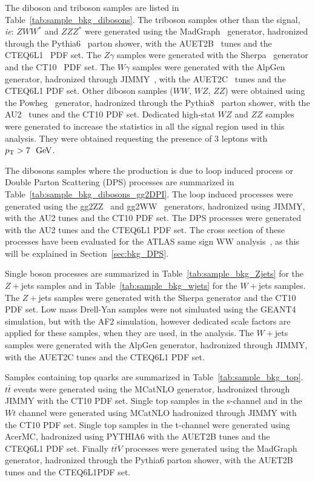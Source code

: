 The diboson and triboson samples are listed in Table~\ref{tab:sample_bkg_dibosons}. The triboson samples other than the signal, \textit{ie}: $ZWW^{*}$ and $ZZZ^{*}$ were generated using the MadGraph~\cite{Alwall_madgraph} generator, hadronized through the Pythia6~\cite{PYTHIA} parton shower, with the AUET2B~\cite{ATL-PHYS-PUB-2011-009} tunes and the CTEQ6L1~\cite{Pumplin:2002vw} PDF set. The $Z\gamma$ samples were generated with the Sherpa~\cite{sherpa} generator and the CT10~\cite{Guzzi:2011sv} PDF set. The $W\gamma$ samples were generated with the AlpGen~\cite{ALPGEN} generator, hadronized through JIMMY~\cite{Jimmy}, with the AUET2C~\cite{ATL-PHYS-PUB-2011-009} tunes and the CTEQ6L1 PDF set. Other diboson samples ($WW$, $WZ$, $ZZ$) were obtained using the Powheg~\cite{Alioli:2008gx,Nason:2004rx,Frixione:2007vw,Alioli:2010xd} generator, hadronized through the Pythia8~\cite{Sjostrand:2007gs} parton shower, with the AU2~\cite{atlasmctunes} tunes and the CT10 PDF set. Dedicated high-stat $WZ$ and $ZZ$ samples were generated to increase the statistics in all the signal region used in this analysis. They were obtained requesting the presence of 3 leptons with $\pt>7~\GeV$.

The dibosons samples where the production is due to loop induced process or Double Parton Scattering (DPS) processes are summarized in Table~\ref{tab:sample_bkg_dibosons_gg2DPI}. The loop induced processes were generated using the gg2ZZ~\cite{Binoth:2008pr} and gg2WW~\cite{Binoth:2006mf} generators, hadronized using JIMMY, with the AU2 tunes and the CT10 PDF set. The DPS processes were generated with the AU2 tunes and the CTEQ6L1 PDF set. The cross section of these processes have been evaluated for the ATLAS same sign WW analysis~\cite{Aad:2014zda}, as this will be explained in Section~\ref{sec:bkg_DPS}.

Single boson processes are summarized in Table~\ref{tab:sample_bkg_Zjets} for the $Z+$jets samples and in Table~\ref{tab:sample_bkg_wjets} for the $W+$jets samples. The $Z+$jets samples were generated with the Sherpa generator and the CT10 PDF set. Low mass Drell-Yan samples were not simluated using the GEANT4 simulation, but with the AF2 simulation, however dedicated scale factors are applied for these samples, when they are used, in the analysis. The $W+$jets samples were generated with the AlpGen generator, hadronized through JIMMY, with the AUET2C tunes and the CTEQ6L1 PDF set.

Samples containing top quarks are summarized in Table~\ref{tab:sample_bkg_top}. $t\bar{t}$ events were generated using the MCatNLO\cite{MCatNLO} generator, hadronized through JIMMY with the CT10 PDF set. Single top samples in the s-channel and in the $Wt$ channel were generated using MCatNLO hadronized through JIMMY with the CT10 PDF set. Single top samples in the t-channel were generated using AcerMC\cite{Kersevan:2004yg}, hadronized using PYTHIA6 with the AUET2B tunes and the CTEQ6L1 PDF set. Finally $t\bar{t}V$ processes were generated using the MadGraph generator, hadronized through the Pythia6 parton shower, with the AUET2B tunes and the CTEQ6L1PDF set.


